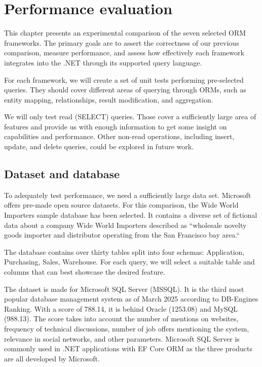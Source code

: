 \section{Performance evaluation}

This chapter presents an experimental comparison of the seven selected ORM frameworks. 
The primary goals are to assert the correctness of our previous comparison, measure performance, and assess how effectively each framework integrates into the .NET through its supported query language.

For each framework, we will create a set of unit tests performing pre-selected queries. They should cover different areas of querying through ORMs, such as entity mapping, relationships, result modification, and aggregation.

We will only test read (SELECT) queries. Those cover a sufficiently large area of features and provide us with enough information to get some insight on capabilities and performance. Other non-read operations, including insert, update, and delete queries, could be explored in future work.

\subsection{Dataset and database}\label{sec:dataset_database}
To adequately test performance, we need a sufficiently large data set. Microsoft offers pre-made open source datasets.
For this comparison, the Wide World Importers sample database \cite{microsoftWWI} has been selected.
It contains a diverse set of fictional data about a company Wide World Importers described as ``wholesale novelty goods importer and distributor operating from the San Francisco bay area.``\cite{microsoftWWI}

The database contains over thirty tables split into four schemas: Application, Purchasing, Sales, Warehouse. For each query, we will select a suitable table and columns that can best showcase the desired feature.

The dataset is made for Microsoft SQL Server (MSSQL). It is the third most popular database management system as of March 2025 according to DB-Engines Ranking\cite{DBEngines2025Ranking}. With a score of 788.14, it is behind Oracle (1253.08) and MySQL (988.13). The score takes into account the number of mentions on websites, frequency of technical discussions, number of job offers mentioning the system, relevance in social networks, and other parameters.\cite{DBEnginesRankingMetrics} 
Microsoft SQL Server is commonly used in .NET applications with EF Core ORM as the three products are all developed by Microsoft.  

